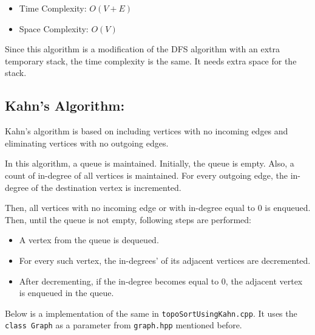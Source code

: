 \documentclass[
]{article}
\begin{document}
\begin{itemize}
\item
  Time Complexity: \(O(V+E)\)
\item
  Space Complexity: \(O(V)\)
\end{itemize}

Since this algorithm is a modification of the DFS algorithm with an
extra temporary stack, the time complexity is the same. It needs extra
space for the stack.

\hypertarget{kahns-algorithm}{%
\subsection{\texorpdfstring{Kahn's Algorithm:
}{Kahn's Algorithm: }}\label{kahns-algorithm}}

Kahn's algorithm is based on including vertices with no incoming edges
and eliminating vertices with no outgoing edges.

In this algorithm, a queue is maintained. Initially, the queue is empty.
Also, a count of in-degree of all vertices is maintained. For every
outgoing edge, the in-degree of the destination vertex is incremented.

Then, all vertices with no incoming edge or with in-degree equal to 0 is
enqueued. Then, until the queue is not empty, following steps are
performed:

\begin{itemize}
\item
  A vertex from the queue is dequeued.
\item
  For every such vertex, the in-degrees' of its adjacent vertices are
  decremented.
\item
  After decrementing, if the in-degree becomes equal to 0, the adjacent
  vertex is enqueued in the queue.
\end{itemize}

Below is a implementation of the same in \texttt{topoSortUsingKahn.cpp}.
It uses the \texttt{class\ Graph} as a parameter from \texttt{graph.hpp}
mentioned before.
\end{document}
